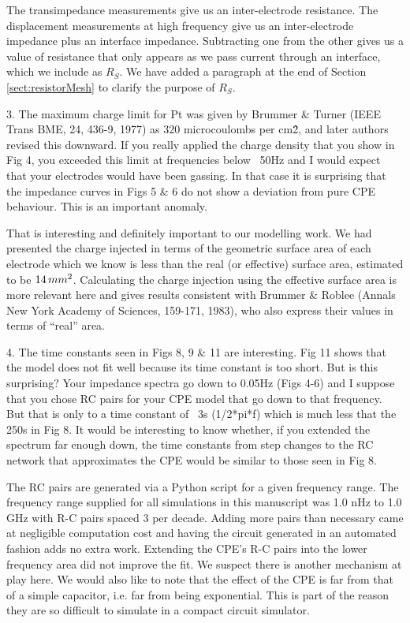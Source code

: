 \documentclass[journal, a4paper]{IEEEtran}
\begin{document}
{{        The transimpedance measurements give us an inter-electrode resistance. The displacement measurements at high frequency give us an inter-electrode impedance plus an interface impedance. Subtracting one from the other gives us a value of resistance that only appears as we pass current through an interface, which we include as $R_{S}$. We have added a paragraph at the end of Section \ref{sect:resistorMesh} to clarify the purpose of $R_{S}$.
    }

    3. The maximum charge limit for Pt was given by Brummer \& Turner (IEEE Trans BME, 24, 436-9, 1977) as 320 microcoulombs per cm\^2, and later authors revised this downward. If you really applied the charge density that you show in Fig 4, you exceeded this limit at frequencies below ~50Hz and I would expect that your electrodes would have been gassing. In that case it is surprising that the impedance curves in Figs 5 \& 6 do not show a deviation from pure CPE behaviour. This is an important anomaly.

    {
        \color{blue}
        That is interesting and definitely important to our modelling work. We had presented the charge injected in terms of the geometric surface area of each electrode which we know is less than the real (or effective) surface area, estimated to be $14\thinspace mm^{2}$. Calculating the charge injection using the effective surface area is more relevant here and gives results consistent with Brummer \& Roblee (Annals New York Academy of Sciences, 159-171, 1983), who also express their values in terms of ``real'' area. 

    }

    4. The time constants seen in Figs 8, 9 \& 11 are interesting. Fig 11 shows that the model does not fit well because its time constant is too short. But is this surprising? Your impedance spectra go down to 0.05Hz (Figs 4-6) and I suppose that you chose RC pairs for your CPE model that go down to that frequency. But that is only to a time constant of ~3s (1/2*pi*f) which is much less that the 250s in Fig 8. It would be interesting to know whether, if you extended the spectrum far enough down, the time constants from step changes to the RC network that approximates the CPE would be similar to those seen in Fig 8.

    {
        \color{blue}
        The RC pairs are generated via a Python script for a given frequency range. The frequency range supplied for all simulations in this manuscript was 1.0 nHz to 1.0 GHz with R-C pairs spaced 3 per decade. Adding more pairs than necessary came at negligible computation cost and having the circuit generated in an automated fashion adds no extra work. Extending the CPE's R-C pairs into the lower frequency area did not improve the fit. We suspect there is another mechanism at play here.
        We would also like to note that the effect of the CPE is far from that of a simple capacitor, i.e. far from being exponential. This is part of the reason they are so difficult to simulate in a compact circuit simulator.
    }

}
\end{document}
